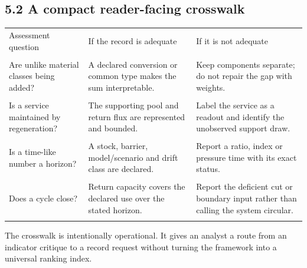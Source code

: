 \documentclass[11pt]{article}
\begin{document}
\subsection{5.2 A compact reader-facing crosswalk}
\begin{tabularx}{\linewidth}{XXX}
\toprule
Assessment question & If the record is adequate & If it is not adequate \\\\
\midrule
Are unlike material classes being added? & A declared conversion or common type makes the sum interpretable. & Keep components separate; do not repair the gap with weights. \\\\
Is a service maintained by regeneration? & The supporting pool and return flux are represented and bounded. & Label the service as a readout and identify the unobserved support draw. \\\\
Is a time-like number a horizon? & A stock, barrier, model/scenario and drift class are declared. & Report a ratio, index or pressure time with its exact status. \\\\
Does a cycle close? & Return capacity covers the declared use over the stated horizon. & Report the deficient cut or boundary input rather than calling the system circular. \\\\
\bottomrule
\end{tabularx}
\medskip
The crosswalk is intentionally operational. It gives an analyst a route from an indicator critique to a record request without turning the framework into a universal ranking index.
\end{document}
